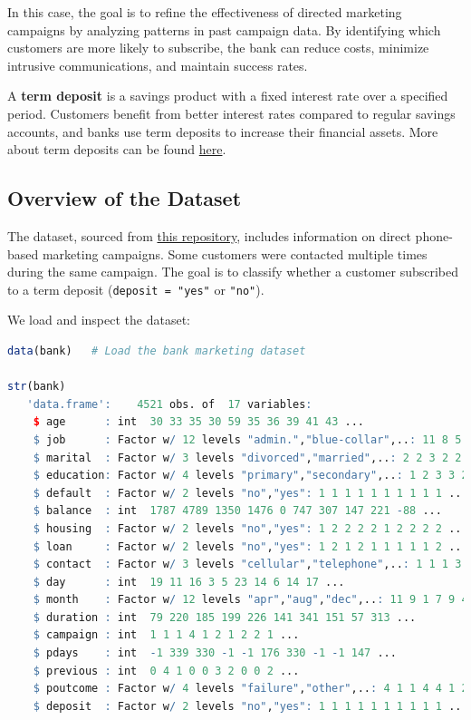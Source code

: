 \documentclass[
]{book}
\newcommand{\passthrough}[1]{#1}
\theoremstyle{definition}
\theoremstyle{definition}
\theoremstyle{definition}
\theoremstyle{definition}
\theoremstyle{remark}
\begin{document}
In this case, the goal is to refine the effectiveness of directed marketing campaigns by analyzing patterns in past campaign data. By identifying which customers are more likely to subscribe, the bank can reduce costs, minimize intrusive communications, and maintain success rates.

A \textbf{term deposit} is a savings product with a fixed interest rate over a specified period. Customers benefit from better interest rates compared to regular savings accounts, and banks use term deposits to increase their financial assets. More about term deposits can be found \href{https://www.investopedia.com/terms/t/termdeposit.asp}{here}.

\subsection*{Overview of the Dataset}\label{overview-of-the-dataset-2}

The dataset, sourced from \href{https://rdrr.io/cran/liver/man/bank.html}{this repository}, includes information on direct phone-based marketing campaigns. Some customers were contacted multiple times during the same campaign. The goal is to classify whether a customer subscribed to a term deposit (\passthrough{\lstinline!deposit = "yes"!} or \passthrough{\lstinline!"no"!}).

We load and inspect the dataset:

\begin{lstlisting}[language=R]
data(bank)   # Load the bank marketing dataset 

str(bank)
   'data.frame':    4521 obs. of  17 variables:
    $ age      : int  30 33 35 30 59 35 36 39 41 43 ...
    $ job      : Factor w/ 12 levels "admin.","blue-collar",..: 11 8 5 5 2 5 7 10 3 8 ...
    $ marital  : Factor w/ 3 levels "divorced","married",..: 2 2 3 2 2 3 2 2 2 2 ...
    $ education: Factor w/ 4 levels "primary","secondary",..: 1 2 3 3 2 3 3 2 3 1 ...
    $ default  : Factor w/ 2 levels "no","yes": 1 1 1 1 1 1 1 1 1 1 ...
    $ balance  : int  1787 4789 1350 1476 0 747 307 147 221 -88 ...
    $ housing  : Factor w/ 2 levels "no","yes": 1 2 2 2 2 1 2 2 2 2 ...
    $ loan     : Factor w/ 2 levels "no","yes": 1 2 1 2 1 1 1 1 1 2 ...
    $ contact  : Factor w/ 3 levels "cellular","telephone",..: 1 1 1 3 3 1 1 1 3 1 ...
    $ day      : int  19 11 16 3 5 23 14 6 14 17 ...
    $ month    : Factor w/ 12 levels "apr","aug","dec",..: 11 9 1 7 9 4 9 9 9 1 ...
    $ duration : int  79 220 185 199 226 141 341 151 57 313 ...
    $ campaign : int  1 1 1 4 1 2 1 2 2 1 ...
    $ pdays    : int  -1 339 330 -1 -1 176 330 -1 -1 147 ...
    $ previous : int  0 4 1 0 0 3 2 0 0 2 ...
    $ poutcome : Factor w/ 4 levels "failure","other",..: 4 1 1 4 4 1 2 4 4 1 ...
    $ deposit  : Factor w/ 2 levels "no","yes": 1 1 1 1 1 1 1 1 1 1 ...
\end{lstlisting}
\end{document}
